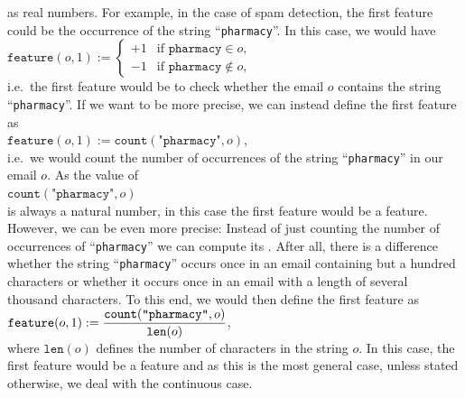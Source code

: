 as real numbers.  For example, in the case of spam detection, the first feature
could be the occurrence of the string ``\texttt{pharmacy}''.  In this case, we would have
\\[0.2cm]
\hspace*{1.3cm}
$\texttt{feature}(o, 1) := \left\{
\begin{array}{ll}
  +1 & \mbox{if \ $\texttt{pharmacy}     \in o$,}      \\
  -1 & \mbox{if \ $\texttt{pharmacy} \not\in o$,}  
\end{array}\right.
$
\\[0.2cm]
i.e.~the first feature would be to check whether the email $o$ contains the string ``\texttt{pharmacy}''.  
If we want to be more precise, we can instead define the first feature as
\\[0.2cm]
\hspace*{1.3cm}
$\texttt{feature}(o, 1) := \mathtt{count}(\texttt{"pharmacy"}, o)$,
\\[0.2cm]
i.e.~we would count the number of occurrences of the string ``\texttt{pharmacy}'' in our email $o$.   
As the value of
\\[0.2cm]
\hspace*{1.3cm}
 $\mathtt{count}(\texttt{"pharmacy"}, o)$ 
\\[0.2cm]
is always a natural number, in this case the first feature would be a
  feature.  However, we can be even more precise: Instead of just counting the number of occurrences of
 ``\texttt{pharmacy}'' we can compute its .  
 After all, there is a difference whether the
 string ``\texttt{pharmacy}'' occurs once in an email containing but a hundred characters or whether it occurs
 once in an email with a length of several thousand characters.  To this end, we would then define the first feature as
\\[0.2cm]
\hspace*{1.3cm}
$\displaystyle \texttt{feature}(o, 1) := \frac{\mathtt{count}(\texttt{"pharmacy"}, o)}{\mathtt{len}(o)}$, 
\\[0.2cm]
where $\mathtt{len}(o)$ defines the number of characters in the string $o$.  In this case, the first feature would be a
 feature and as this is the most general case, unless stated otherwise, we deal with the continuous
case. 

